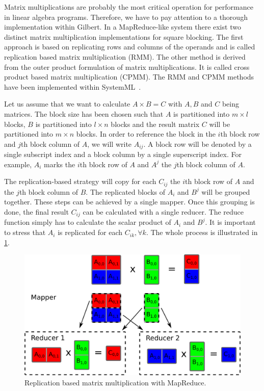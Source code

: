 Matrix multiplications are probably the most critical operation for performance in linear algebra programs.
Therefore, we have to pay attention to a thorough implementation within Gilbert.
In a MapReduce-like system there exist two distinct matrix multiplication implementations for square blocking.
The first approach is based on replicating rows and columns of the operands and is called replication based matrix multiplication (RMM).
The other method is derived from the outer product formulation of matrix multiplications.
It is called cross product based matrix multiplication (CPMM).
The RMM and CPMM methods have been implemented within SystemML~\cite{ghoting:2011a}.

Let us assume that we want to calculate $A \times B = C$ with $A,B$ and $C$ being matrices.
The block size has been chosen such that $A$ is partitioned into $m\times l$ blocks, $B$ is partitioned into $l \times n$ blocks and the result matrix $C$ will be partitioned into $m\times n$ blocks.
In order to reference the block in the $i$th block row and $j$th block column of $A$, we will write $A_{ij}$.
A block row will be denoted by a single subscript index and a block column by a single superscript index.
For example, $A_i$ marks the $i$th block row of $A$ and $A^j$ the $j$th block column of $A$.

The replication-based strategy will copy for each $C_{ij}$ the $i$th block row of $A$ and the $j$th block column of $B$.
The replicated blocks of $A_i$ and $B^j$ will be grouped together.
These steps can be achieved by a single mapper.
Once this grouping is done, the final result $C_{ij}$ can be calculated with a single reducer.
The reduce function simply has to calculate the scalar product of $A_i$ and $B^j$.
It is important to stress that $A_i$ is replicated for each $C_{ik},\forall k$.
The whole process is illustrated in \cref{fig:RMM}.

\begin{figure}[!h]
	\centering
	\includegraphics[width=0.4777\linewidth]{images/rmm.png}
	\caption{Replication based matrix multiplication with MapReduce.}
	\label{fig:RMM}
\end{figure}

